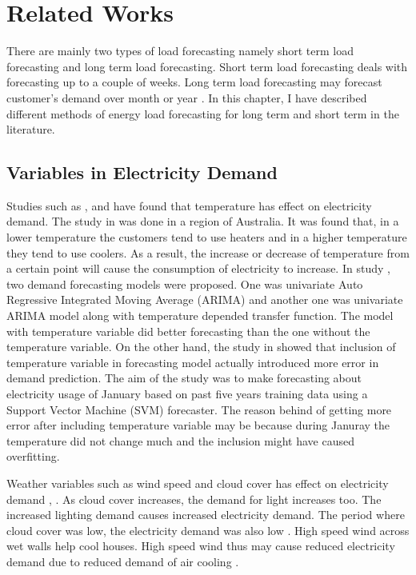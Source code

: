 
\chapter{Related Works}

There are mainly two types of load forecasting namely short term load forecasting and long term load forecasting. Short term load forecasting deals with forecasting up to a couple of weeks. Long term load forecasting may forecast customer's demand over month or year \cite{cho1995customer}. In this chapter, I have described different methods of energy load forecasting for long term and short term in the literature.

\section{Variables in Electricity Demand}

Studies such as \cite{hor2005analyzing}, \cite{hart2004weather} and \cite{cho1995customer} have found that temperature has effect on electricity demand. The study in \cite{hart2004weather} was done in a region of Australia.  It was found that,  in a lower temperature the customers tend to use heaters and in a higher temperature they tend to use coolers. As a result, the increase or decrease of temperature from a certain point will cause the consumption of electricity to increase. In study \cite{cho1995customer}, two demand forecasting models were proposed. One was univariate Auto Regressive Integrated Moving Average (ARIMA) and another one was univariate ARIMA model along with temperature depended transfer function. The model with temperature variable did better forecasting than the one without the temperature variable. On the other hand, the study in  \cite{chen2004load} showed that inclusion of temperature variable in forecasting model actually introduced more error in demand prediction. The aim of the study was to make forecasting about electricity usage of January based on past five years training data using a Support Vector Machine (SVM)  forecaster. The reason behind of getting more error after including temperature variable may be because during Januray the temperature did not change much and the inclusion might have caused overfitting. 

Weather variables such as  wind speed and cloud cover has effect on electricity demand \cite{hor2005analyzing}, \cite{rudenauer2004energy}. As cloud cover increases, the demand for light increases too. The increased lighting demand causes increased electricity demand. The period where cloud cover was low, the electricity demand was also low \cite{hor2005analyzing}. High speed wind across wet walls help cool houses. High speed wind thus may cause reduced electricity demand due to reduced demand of air cooling \cite{rudenauer2004energy}. 



